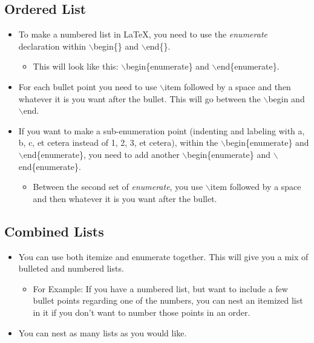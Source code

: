 \documentclass{article}
\begin{document}
		\subsection{Ordered List}
			\begin{itemize}
				\item To make a numbered list in \LaTeX{}, you need to use the \textit{enumerate} declaration within $\backslash$begin\{\} and $\backslash$end\{\}.
				\begin{itemize}
					\item This will look like this: $\backslash$begin\{enumerate\} and $\backslash$end\{enumerate\}.
				\end{itemize}
				\item For each bullet point you need to use $\backslash$item followed by a space and then whatever it is you want after the bullet. This will go between the $\backslash$begin and $\backslash$end.
				\item If you want to make a sub-enumeration point (indenting and labeling with a, b, c, et cetera instead of 1, 2, 3, et cetera), within the $\backslash$begin\{enumerate\} and $\backslash$end\{enumerate\}, you need to add another $\backslash$begin\{enumerate\} and $\backslash$end\{enumerate\}.
				\begin{itemize}
					\item Between the second set of \textit{enumerate}, you  use $\backslash$item followed by a space and then whatever it is you want after the bullet.
				\end{itemize}
			\end{itemize}
	
		\subsection{Combined Lists}
			\begin{itemize}
				\item You can use both itemize and enumerate together. This will give you a mix of bulleted and numbered lists.
				\begin{itemize}
					\item For Example: If you have a numbered list, but want to include a few bullet points regarding one of the numbers, you can nest an itemized list in it if you don\rq{}t want to number those points in an order.
				\end{itemize}
				\item You can nest as many lists as you would like.
			\end{itemize}
\end{document}
